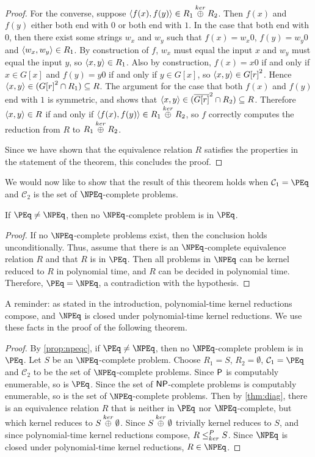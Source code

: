 \begin{proof}
  For the converse, suppose $\pair{f(x)}{f(y)}\in R_1\kj R_2$.
  Then $f(x)$ and $f(y)$ either both end with $0$ or both end with $1$.
  In the case that both end with $0$, then there exist some strings $w_x$ and $w_y$ such that $f(x)=w_x0$, $f(y)=w_y0$ and $\pair{w_x}{w_y}\in R_1$.
  By construction of $f$, $w_x$ must equal the input $x$ and $w_y$ must equal the input $y$, so $\pair{x}{y}\in R_1$.
  Also by construction, $f(x)=x0$ if and only if $x\in G[x]$ and $f(y)=y0$ if and only if $y\in G[x]$, so $\pair{x}{y}\in{G[r]}^2$.
  Hence $\pair{x}{y}\in({G[r]}^2\cap R_1)\subseteq R$.
  The argument for the case that both $f(x)$ and $f(y)$ end with $1$ is symmetric, and shows that $\pair{x}{y}\in(\overline{G[r]}^2\cap R_2)\subseteq R$.
  Therefore $\pair{x}{y}\in R$ if and only if $\pair{f(x)}{f(y)}\in R_1\kj R_2$, so $f$ correctly computes the reduction from $R$ to $R_1\kj R_2$.

  Since we have shown that the equivalence relation $R$ satisfies the properties in the statement of the theorem, this concludes the proof.
\end{proof}

We would now like to show that the result of this theorem holds when $\mathcal{C}_1 = \PEq$ and $\mathcal{C}_2$ is the set of $\NPEq$-complete problems.

\begin{proposition}\label{prop:npeqc}
  If $\PEq \neq \NPEq$, then no $\NPEq$-complete problem is in $\PEq$.
\end{proposition}
\begin{proof}
  If no $\NPEq$-complete problems exist, then the conclusion holds unconditionally.
  Thus, assume that there is an $\NPEq$-complete equivalence relation $R$ and that $R$ is in $\PEq$.
  Then all problems in $\NPEq$ can be kernel reduced to $R$ in polynomial time, and $R$ can be decided in polynomial time.
  Therefore, $\PEq = \NPEq$, a contradiction with the hypothesis.
\end{proof}

A reminder: as stated in the introduction, polynomial-time kernel reductions compose, and $\NPEq$ is closed under polynomial-time kernel reductions.
We use these facts in the proof of the following theorem.

\intermediary
\begin{proof}
  By \autoref{prop:npeqc}, if $\PEq \neq \NPEq$, then no $\NPEq$-complete problem is in $\PEq$.
  Let $S$ be an $\NPEq$-complete problem.
  Choose $R_1=S$, $R_2=\emptyset$, $\mathcal{C}_1=\PEq$ and $\mathcal{C}_2$ to be the set of $\NPEq$-complete problems.
  Since $\P$ is computably enumerable, so is $\PEq$.
  Since the set of $\NP$-complete problems is computably enumerable, so is the set of $\NPEq$-complete problems.
  Then by \autoref{thm:diag}, there is an equivalence relation $R$ that is neither in $\PEq$ nor $\NPEq$-complete, but which kernel reduces to $S \kj \emptyset$.
  Since $S \kj \emptyset$ trivially kernel reduces to $S$, and since polynomial-time kernel reductions compose, $R \kr S$.
  Since $\NPEq$ is closed under polynomial-time kernel reductions, $R \in \NPEq$.
\end{proof}

